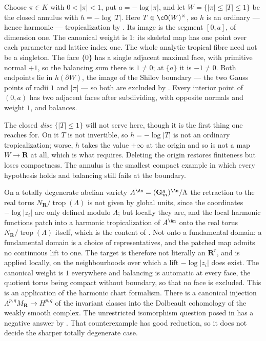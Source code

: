 \begin{example}
\label{ex:ch18-harmonic-disc}
Choose $\pi\in K$ with $0<|\pi|<1$, put $a=-\log|\pi|$, and let
$W=\{|\pi|\leq|T|\leq1\}$ be the closed annulus with $h=-\log|T|$.  Here
$T\in\cO(W)^\times$, so $h$ is an ordinary --- hence harmonic ---
tropicalization by
.  Its image is the segment $[0,a]$,
of dimension one.  The canonical weight is $1$: its skeletal map has
one point over each parameter and lattice index one.  The whole analytic
tropical fibre need not be a singleton.  The face $\{0\}$ has a single adjacent maximal face,
with primitive normal $+1$, so the balancing sum there is $1\neq0$; at
$\{a\}$ it is $-1\neq0$.  Both endpoints lie in $h(\partial W)$, the image
of the Shilov boundary --- the two Gauss points of radii $1$ and $|\pi|$ ---
so both are excluded by .  Every interior point
of $(0,a)$ has two adjacent faces after subdividing, with opposite normals
and weight $1$, and balances.

The closed \emph{disc} $\{|T|\leq1\}$ will not serve here, though it is the
first thing one reaches for.  On it $T$ is not invertible, so $h=-\log|T|$
is not an ordinary tropicalization; worse, $h$ takes the value $+\infty$ at
the origin and so is not a map $W\to\mathbf R$ at all, which is what
 requires.  Deleting the origin restores
finiteness but loses compactness.  The annulus is the smallest compact
example in which every hypothesis holds and balancing still fails at the
boundary.
\end{example}

\begin{example}
\label{ex:ch18-harmonic-abelian}
On a totally degenerate abelian variety $A^{\An}=(\mathbf G_m^{g})^{\An}/\Lambda$
the retraction to the real torus
$N_{\mathbf R}/\!\operatorname{trop}(\Lambda)$ is not given by
global units, since the coordinates $-\log|z_i|$ are only defined modulo
$\Lambda$; but locally they are, and the local harmonic
functions patch into a harmonic tropicalization of $A^{\An}$ onto the real
torus $N_{\mathbf R}/\!\operatorname{trop}(\Lambda)$ itself, which is the
content of .  Not onto a
fundamental domain: a fundamental domain is a choice of representatives, and
the patched map admits no continuous lift to one.  The target is therefore
not literally an $\mathbf R^r$, and  is applied
locally, on the neighbourhoods over which a lift $-\log|z_i|$ does exist.
The canonical weight is $1$ everywhere and balancing is automatic at every
face, the quotient torus being compact without boundary, so that no face is
excluded.  This is an application of the harmonic chart formalism.  There is a canonical injection
$\Lambda^{p,q}M_{\mathbf R}\to H^{p,q}$ of the invariant classes into the
Dolbeault cohomology of the weakly smooth complex.  The unrestricted
isomorphism question posed in \cite[\S1.15]{GJR26} has a negative answer by
.  That counterexample has good
reduction, so it does not decide the sharper totally degenerate case.
\end{example}


